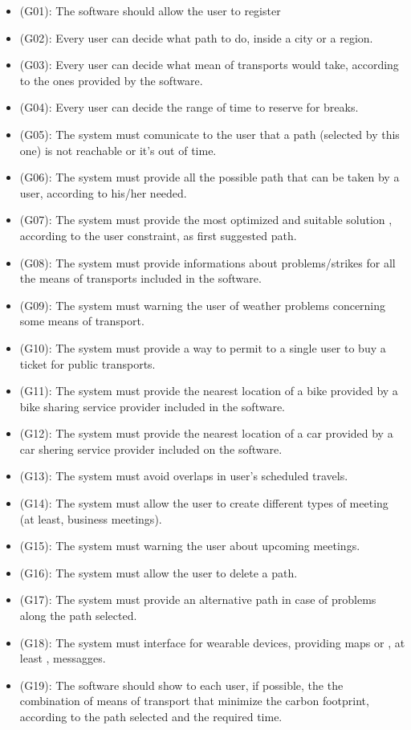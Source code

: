 \documentclass[a4paper]{book}
\begin{document}
\begin{itemize}
\item (G01): The software should allow the user to register
\item (G02): Every user can decide what path to do, inside a city or a region.
\item (G03): Every user can decide what mean of transports would take, according to the ones provided by the software.
\item (G04): Every user can decide the range of time to reserve for breaks. 
\item (G05): The system must comunicate to the user that a path (selected by this one) is not reachable or it's out of time.
\item (G06): The system must provide all the possible path that can be taken by a user, according to his/her needed.
\item (G07): The system must provide the most optimized and suitable solution , according to the user constraint, as first suggested path.
\item (G08): The system must provide informations about problems/strikes for all the means of transports included in the software.
\item (G09): The system must warning the user of weather problems concerning some means of transport.
\item (G10): The system must provide a way to permit to a single user to buy a ticket for public transports.
\item (G11): The system must provide the nearest location of a bike provided by a bike sharing service provider included in the software.
\item (G12): The system must provide the nearest location of a car provided by a car shering service provider included on the software.
\item (G13): The system must avoid overlaps in user's scheduled travels.
\item (G14): The system must allow the user to create different types of meeting (at least, business meetings).
\item (G15): The system must warning the user about upcoming meetings.
\item (G16): The system must allow the user to delete a path.
\item (G17): The system must provide an alternative path in case of problems along the path selected.
\item (G18): The system must interface for wearable devices, providing maps or , at least , messagges.
\item (G19): The software should show to each user, if possible, the the combination of means of transport that minimize the carbon footprint, according to the path selected and the required time.

\end{itemize}
\end{document}
